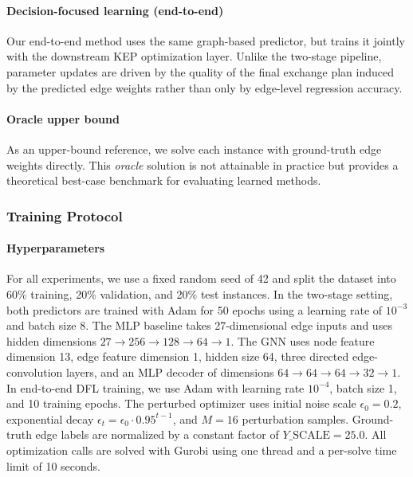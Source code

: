\documentclass{article}
\begin{document}
\paragraph{Decision-focused learning (end-to-end)}
Our end-to-end method uses the same graph-based predictor, but trains it jointly with the downstream KEP optimization layer. Unlike the two-stage pipeline, parameter updates are driven by the quality of the final exchange plan induced by the predicted edge weights rather than only by edge-level regression accuracy.

\paragraph{Oracle upper bound}
As an upper-bound reference, we solve each instance with ground-truth edge weights directly. This \emph{oracle} solution is not attainable in practice but provides a theoretical best-case benchmark for evaluating learned methods.

\subsubsection{Training Protocol}

\paragraph{Hyperparameters}
For all experiments, we use a fixed random seed of 42 and split the dataset into 60\% training, 20\% validation, and 20\% test instances. In the two-stage setting, both predictors are trained with Adam for 50 epochs using a learning rate of $10^{-3}$ and batch size 8. The MLP baseline takes 27-dimensional edge inputs and uses hidden dimensions $27 \rightarrow 256 \rightarrow 128 \rightarrow 64 \rightarrow 1$. The GNN uses node feature dimension 13, edge feature dimension 1, hidden size 64, three directed edge-convolution layers, and an MLP decoder of dimensions $64 \rightarrow 64 \rightarrow 64 \rightarrow 32 \rightarrow 1$. In end-to-end DFL training, we use Adam with learning rate $10^{-4}$, batch size 1, and 10 training epochs. The perturbed optimizer uses initial noise scale $\epsilon_0 = 0.2$, exponential decay $\epsilon_t = \epsilon_0 \cdot 0.95^{t-1}$, and $M = 16$ perturbation samples. Ground-truth edge labels are normalized by a constant factor of $Y\_\text{SCALE} = 25.0$. All optimization calls are solved with Gurobi using one thread and a per-solve time limit of 10 seconds.
\end{document}
